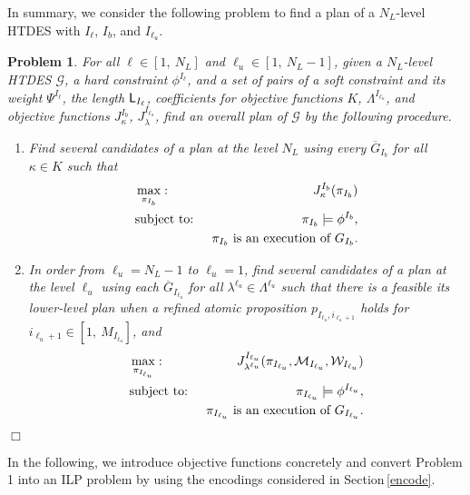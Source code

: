 \documentclass{article}
\newcommand{\qedwhite}{\hfill \ensuremath{\Box}}
\newtheorem{pbm}{Problem}
\newcommand{\rsec}[1]{Section\,\ref{#1}}
\newcommand{\Len}{{\sf L}}
\newcommand{\M}{\mathcal{M}}
\newcommand{\W}{\mathcal{W}}
\newcommand{\Iu}{I_{\ell_u}}
\begin{document}
In summary, we consider the following problem to find a plan of a $N_L$-level HTDES with $I_\ell$, $I_b$, and $\Iu$.%
\begin{pbm}\label{pbm3}
For all $\ell\in[1,~N_L]$ and $\ell_u\in[1,~N_L-1]$, given a $N_L$-level HTDES $\mathcal{G}$, a hard constraint $\phi^{I_{\ell}}$, and a set of pairs of a soft constraint and its weight $\Psi^{I_{\ell}}$, the length $\Len_{I_{\ell}}$, 
coefficients for objective functions $K$, $\Lambda^{\Iu}$, and objective functions $J_\kappa^{I_b}$, $J_{\lambda}^{\Iu}$, find an overall plan of $\mathcal{G}$ by the following procedure.
%
\begin{enumerate}
\item
Find several candidates of a plan at the level $N_L$ using every $\overline{G}_{I_{b}}$ for all $\kappa\in K$ such that 
\begin{eqnarray}
&\max_{\pi_{I_{b}}}:~&J_\kappa^{I_{b}} (\pi_{I_{b}})\notag \\
&\mbox{subject to: }&\pi_{I_{b}}\models \phi^{I_{b}},\notag%
\\&&\pi_{I_{b}}\mbox{ is an execution of } {G}_{I_{b}}.\notag 
\end{eqnarray}
%
%
%
\item
In order from $\ell_u=N_L-1$ to $\ell_u=1$, find several candidates of a plan at the level $\ell_u$ using each  $\overline{G}_{\Iu}$ for all $\lambda^{{\ell_u}}\in \Lambda^{{\ell_u}}$ 
such that there is a feasible its  lower-level plan
when a refined atomic proposition $p_{{\Iu},i_{\ell_u+1}}$ holds for $i_{\ell_u+1}\in [1,~M_{\Iu}]$, and
\begin{eqnarray}
&\max_{\pi_{\Iu}}:~&J_{\lambda^{\ell_u}}^{\Iu} (\pi_{\Iu},\mathcal{M}_{\Iu},\mathcal{W}_{\Iu})\notag \\
&\mbox{subject to: }&\pi_{\Iu}\models \phi^{\Iu},\notag%
\\&&\pi_{\Iu}\mbox{ is an execution of }G_{\Iu}.\notag 
\end{eqnarray}
%
%
\begin{comment}

\item
Find a top-level plan using the top-level TDES $G$  such that there is a feasible bottom-level plan for every time $p_{i}$ is true for every $i\in [1,~M]$, and
\begin{eqnarray}
&\mbox{max: }&J_{\mu,\M,\W}\notag \\
&\mbox{subject to: }&\pi(J_{\mu,\M,\W})\models \phi,\notag%
\\&&\mbox{transition lows of }G.\notag 
\end{eqnarray}
\end{comment}
\end{enumerate}
%
%
%
\qedwhite
\end{pbm}
%
In the following, we introduce objective functions concretely and convert Problem 1 into an ILP problem by using the encodings considered in \rsec{encode}.
\end{document}
